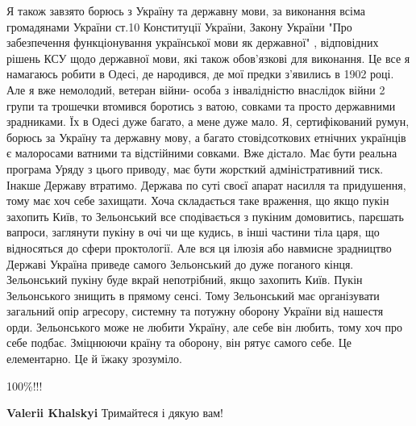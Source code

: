 \begin{itemize}
Я також завзято борюсь з Україну та державну мови, за виконання всіма
громадянами України ст.10 Конституції України, Закону України "Про забезпечення
функціонування української мови як державної" , відповідних рішень КСУ щодо
державної мови, які також обов'язкові для виконання. Це все я намагаюсь робити
в Одесі, де народився, де мої предки з'явились в 1902 році. Але я вже
немолодий, ветеран війни- особа з інвалідністю внаслідок війни 2 групи та
трошечки втомився боротись з ватою, совками та просто державними зрадниками. Їх
в Одесі дуже багато, а мене дуже мало. Я, сертифікований румун, борюсь за
Україну та державну мову, а багато стовідсоткових етнічних українців є
малоросами ватними та відстійними совками. Вже дістало. Має бути реальна
програма Уряду з цього приводу, має бути жорсткий адміністративний тиск. Інакше
Державу втратимо. Держава по суті своєї апарат насилля та придушення, тому має
хоч себе захищати. Хоча складається таке враження, що якщо пукін захопить Київ,
то Зельонський все сподівається з пукіним домовитись, парєшать вапроси,
заглянути пукіну в очі чи ще кудись, в інші частини тіла царя, що відносяться
до сфери проктології. Але вся ця ілюзія або навмисне зрадництво Державі Україна
приведе самого Зельонський до дуже поганого кінця. Зельонський пукіну буде
вкрай непотрібний, якщо захопить Київ. Пукін Зельонського знищить в прямому
сенсі. Тому Зельонський має організувати загальний опір агресору, системну та
потужну оборону України від нашестя орди. Зельонського може не любити Україну,
але себе він любить, тому хоч про себе подбає. Зміцнюючи країну та оборону, він
рятує самого себе. Це елементарно. Це й їжаку зрозуміло.

\begin{itemize}
 
100\%!!!

 
\textbf{Valerii Khalskyi}
Тримайтеся і дякую вам!

 

\end{itemize}
\end{itemize}
